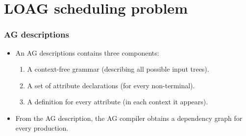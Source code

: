 \documentclass{beamer}
\begin{document}
\section{LOAG scheduling problem}
\begin{frame}
    \frametitle{AG descriptions}
    \begin{itemize}
        \item An AG descriptions contains three components:
        \begin{enumerate}
            \item A context-free grammar (describing all possible input trees).
            \item A set of attribute declarations (for every non-terminal).
            \item A definition for every attribute (in each context it appears).
        \end{enumerate}
        \item From the AG description, the AG compiler obtains a dependency 
                graph for every production.
    \end{itemize}
\end{frame}

%
\end{document}
